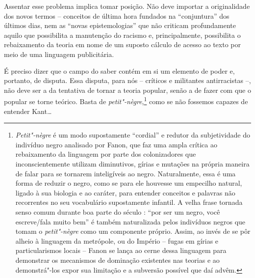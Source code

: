 Assentar esse problema implica tomar posição. Não deve importar a
originalidade dos novos termos -- conceitos de última hora fundados na
``conjuntura'' dos últimos dias, nem as ``novas epistemologias'' que não
criticam profundamente aquilo que possibilita a manutenção do racismo e,
principalmente, possibilita o rebaixamento da teoria em nome de um
suposto cálculo de acesso ao texto por meio de uma linguagem
publicitária.

É preciso dizer que o campo do saber contém em si um elemento de poder
e, portanto, de disputa. Essa disputa, para nós -- críticos e militantes
antirracistas --, não deve ser a da tentativa de tornar a teoria
popular, senão a de fazer com que o popular se torne teórico. Basta de
\emph{petit"-nègre},\footnote{\emph{Petit"-nègre} é um modo supostamente
  ``cordial'' e redutor da subjetividade do indivíduo negro analisado
  por Fanon, que faz uma ampla crítica ao rebaixamento da linguagem por
  parte dos colonizadores que inconscientemente utilizam diminutivos,
  gírias e mutações na própria maneira de falar para se tornarem
  inteligíveis ao negro. Naturalmente, essa é uma forma de reduzir o
  negro, como se para ele houvesse um empecilho natural, ligado à sua
  biologia e ao caráter, para entender conceitos e palavras não
  recorrentes no seu vocabulário supostamente infantil. A velha frase
  tornada senso comum durante boa parte do século : ``por ser um
  negro, você escreve/fala muito bem'' é também naturalizada pelos
  indivíduos negros que tomam o \emph{petit"-nègre} como um componente
  próprio. Assim, ao invés de se pôr alheio à linguagem da metrópole, ou
  do Império -- fugas em gírias e particularismos locais -- Fanon se
  lança ao cerne dessa linguagem para demonstrar os mecanismos de
  dominação existentes nas teorias e ao demonstrá"-los expor sua
  limitação e a subversão possível que daí advêm.} como se não fossemos
capazes de entender Kant\ldots{}

